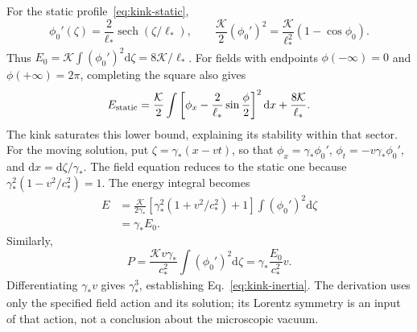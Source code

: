 \documentclass[11pt,a4paper]{article}
\numberwithin{equation}{section}
\newcommand{\dd}{\mathrm{d}}
\begin{document}
For the static profile~\eqref{eq:kink-static},
\begin{equation}
 \phi_0'(\zeta)=\frac{2}{\ell_*}\operatorname{sech}(\zeta/\ell_*),
 \qquad
 \frac{\mathcal K}{2}(\phi_0')^2
 =\frac{\mathcal K}{\ell_*^2}(1-\cos\phi_0).
\end{equation}
Thus $E_0=\mathcal K\int(\phi_0')^2\dd\zeta=8\mathcal K/\ell_*$. For fields with endpoints $\phi(-\infty)=0$ and $\phi(+\infty)=2\pi$, completing the square also gives
\begin{equation}
 E_{\rm static}=\frac{\mathcal K}{2}\int
 \left[\phi_x-\frac{2}{\ell_*}\sin\frac{\phi}{2}\right]^2\dd x
 +\frac{8\mathcal K}{\ell_*}.
\end{equation}
The kink saturates this lower bound, explaining its stability within that sector. For the moving solution, put $\zeta=\gamma_*(x-vt)$, so that $\phi_x=\gamma_*\phi_0'$, $\phi_t=-v\gamma_*\phi_0'$, and $\dd x=\dd\zeta/\gamma_*$. The field equation reduces to the static one because $\gamma_*^2(1-v^2/c_*^2)=1$. The energy integral becomes
\begin{align}
 E&=\frac{\mathcal K}{2\gamma_*}
 \left[\gamma_*^2(1+v^2/c_*^2)+1\right]
 \int(\phi_0')^2\dd\zeta\\
 &=\gamma_* E_0.
\end{align}
Similarly,
\begin{equation}
 P=\frac{\mathcal K v\gamma_*}{c_*^2}
 \int(\phi_0')^2\dd\zeta
 =\gamma_*\frac{E_0}{c_*^2}v.
\end{equation}
Differentiating $\gamma_*v$ gives $\gamma_*^3$, establishing Eq.~\eqref{eq:kink-inertia}. The derivation uses only the specified field action and its solution; its Lorentz symmetry is an input of that action, not a conclusion about the microscopic vacuum.
\end{document}
